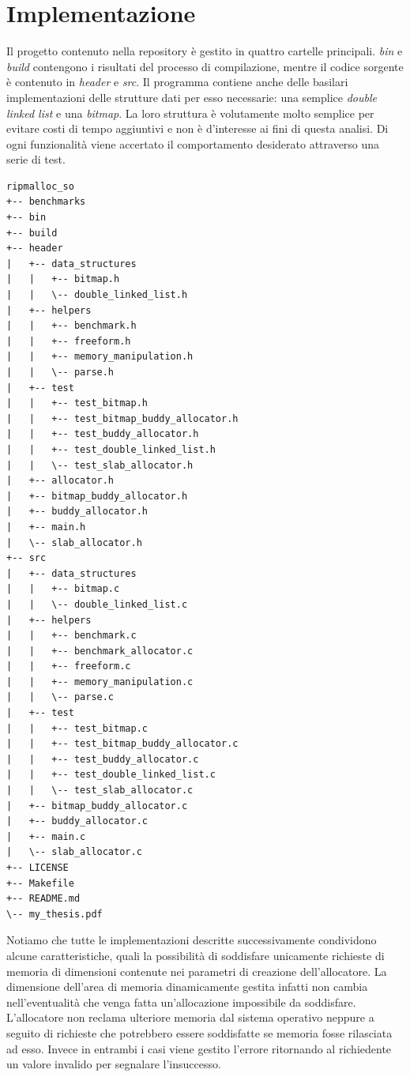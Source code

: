 \chapter{Implementazione}
Il progetto contenuto nella repository è gestito in quattro cartelle principali. \textit{bin} e \textit{build} contengono i risultati del processo di compilazione, mentre il codice sorgente è contenuto in \textit{header} e \textit{src}. Il programma contiene anche delle basilari implementazioni delle strutture dati per esso necessarie: una semplice \textit{double linked list} e una \textit{bitmap}. La loro struttura è volutamente molto semplice per evitare costi di tempo aggiuntivi e non è d’interesse ai fini di questa analisi. Di ogni funzionalità viene accertato il comportamento desiderato attraverso una serie di test.

\begin{lstlisting}
ripmalloc_so
+-- benchmarks
+-- bin
+-- build
+-- header
|   +-- data_structures
|   |   +-- bitmap.h
|   |   \-- double_linked_list.h
|   +-- helpers
|   |   +-- benchmark.h
|   |   +-- freeform.h
|   |   +-- memory_manipulation.h
|   |   \-- parse.h
|   +-- test
|   |   +-- test_bitmap.h
|   |   +-- test_bitmap_buddy_allocator.h
|   |   +-- test_buddy_allocator.h
|   |   +-- test_double_linked_list.h
|   |   \-- test_slab_allocator.h
|   +-- allocator.h
|   +-- bitmap_buddy_allocator.h
|   +-- buddy_allocator.h
|   +-- main.h
|   \-- slab_allocator.h
+-- src
|   +-- data_structures
|   |   +-- bitmap.c
|   |   \-- double_linked_list.c
|   +-- helpers
|   |   +-- benchmark.c
|   |   +-- benchmark_allocator.c
|   |   +-- freeform.c
|   |   +-- memory_manipulation.c
|   |   \-- parse.c
|   +-- test
|   |   +-- test_bitmap.c
|   |   +-- test_bitmap_buddy_allocator.c
|   |   +-- test_buddy_allocator.c
|   |   +-- test_double_linked_list.c
|   |   \-- test_slab_allocator.c
|   +-- bitmap_buddy_allocator.c
|   +-- buddy_allocator.c
|   +-- main.c
|   \-- slab_allocator.c
+-- LICENSE
+-- Makefile
+-- README.md
\-- my_thesis.pdf
\end{lstlisting}

Notiamo che tutte le implementazioni descritte successivamente condividono alcune caratteristiche, quali la possibilità di soddisfare unicamente richieste di memoria di dimensioni contenute nei parametri di creazione dell'allocatore. La dimensione dell’area di memoria dinamicamente gestita infatti non cambia nell’eventualità che venga fatta un’allocazione impossibile da soddisfare. L’allocatore non reclama ulteriore memoria dal sistema operativo neppure a seguito di richieste che potrebbero essere soddisfatte se memoria fosse rilasciata ad esso. Invece in entrambi i casi viene gestito l’errore ritornando al richiedente un valore invalido per segnalare l’insuccesso.

